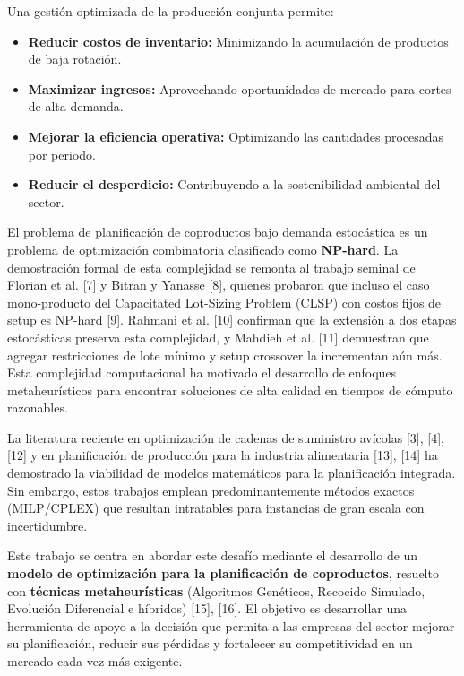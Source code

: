 \documentclass[
  spanish,
  12pt,
]{article}
\providecommand{\tightlist}{%
  \setlength{\itemsep}{0pt}\setlength{\parskip}{0pt}}
\begin{document}
Una gestión optimizada de la producción conjunta permite:

\begin{itemize}
\tightlist
\item
  \textbf{Reducir costos de inventario:} Minimizando la acumulación de
  productos de baja rotación.
\item
  \textbf{Maximizar ingresos:} Aprovechando oportunidades de mercado
  para cortes de alta demanda.
\item
  \textbf{Mejorar la eficiencia operativa:} Optimizando las cantidades
  procesadas por periodo.
\item
  \textbf{Reducir el desperdicio:} Contribuyendo a la sostenibilidad
  ambiental del sector.
\end{itemize}

El problema de planificación de coproductos bajo demanda estocástica es
un problema de optimización combinatoria clasificado como
\textbf{NP-hard}. La demostración formal de esta complejidad se remonta
al trabajo seminal de Florian et al. {[}7{]} y Bitran y Yanasse {[}8{]},
quienes probaron que incluso el caso mono-producto del Capacitated
Lot-Sizing Problem (CLSP) con costos fijos de setup es NP-hard {[}9{]}.
Rahmani et al. {[}10{]} confirman que la extensión a dos etapas
estocásticas preserva esta complejidad, y Mahdieh et al. {[}11{]}
demuestran que agregar restricciones de lote mínimo y setup crossover la
incrementan aún más. Esta complejidad computacional ha motivado el
desarrollo de enfoques metaheurísticos para encontrar soluciones de alta
calidad en tiempos de cómputo razonables.

La literatura reciente en optimización de cadenas de suministro avícolas
{[}3{]}, {[}4{]}, {[}12{]} y en planificación de producción para la
industria alimentaria {[}13{]}, {[}14{]} ha demostrado la viabilidad de
modelos matemáticos para la planificación integrada. Sin embargo, estos
trabajos emplean predominantemente métodos exactos (MILP/CPLEX) que
resultan intratables para instancias de gran escala con incertidumbre.

Este trabajo se centra en abordar este desafío mediante el desarrollo de
un \textbf{modelo de optimización para la planificación de coproductos},
resuelto con \textbf{técnicas metaheurísticas} (Algoritmos Genéticos,
Recocido Simulado, Evolución Diferencial e híbridos) {[}15{]}, {[}16{]}.
El objetivo es desarrollar una herramienta de apoyo a la decisión que
permita a las empresas del sector mejorar su planificación, reducir sus
pérdidas y fortalecer su competitividad en un mercado cada vez más
exigente.
\end{document}
